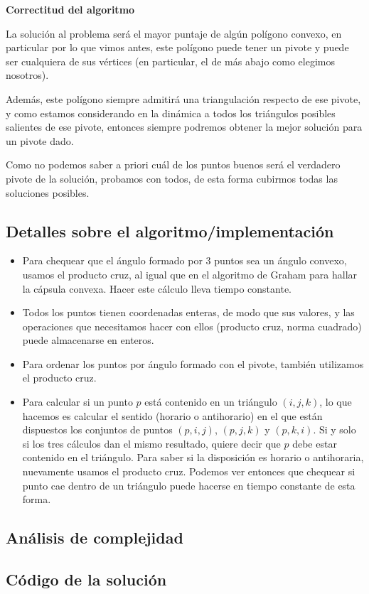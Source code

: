 \textbf{Correctitud del algoritmo}

La solución al problema será el mayor puntaje de algún polígono convexo, 
en particular por lo que vimos antes, este polígono puede tener un pivote y puede 
ser cualquiera de sus vértices (en particular, el de más abajo como elegimos nosotros). 

Además, este polígono siempre admitirá una triangulación respecto de ese pivote, y como 
estamos considerando en la dinámica a todos los triángulos posibles salientes de ese pivote, entonces 
siempre podremos obtener la mejor solución para un pivote dado. 

Como no podemos saber a priori cuál de los puntos buenos será el verdadero pivote de la solución, 
probamos con todos, de esta forma cubirmos todas las soluciones posibles. 

\subsection{Detalles sobre el algoritmo/implementación}
\begin{itemize}
\item Para chequear que el ángulo formado por 3 puntos sea un ángulo convexo, usamos 
el producto cruz, al igual que en el algoritmo de Graham para hallar la cápsula convexa. 
Hacer este cálculo lleva tiempo constante. 
\item Todos los puntos tienen coordenadas enteras, de modo que sus valores, y 
las operaciones que necesitamos hacer con ellos (producto cruz, norma cuadrado) puede almacenarse 
en enteros. 
\item Para ordenar los puntos por ángulo formado con el pivote, también utilizamos el producto 
cruz. 
\item Para calcular si un punto $p$ está contenido en un triángulo $(i,j,k)$, lo que hacemos 
es calcular el sentido (horario o antihorario) en el que están dispuestos los conjuntos de puntos 
$(p,i,j)$, $(p,j,k)$ y $(p,k,i)$. Si y solo si los tres cálculos dan el mismo resultado, quiere 
decir que $p$ debe estar contenido en el triángulo. Para saber si la disposición es horario o antihoraria, 
nuevamente usamos el producto cruz. Podemos ver entonces que chequear si punto cae dentro de un triángulo 
puede hacerse en tiempo constante de esta forma. 
\end{itemize}

\subsection{Análisis de complejidad}


\newpage
\subsection{Código de la solución}

